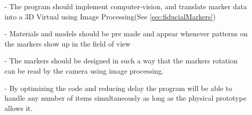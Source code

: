 \begin{itemize}
						\item[-] The program should implement computer-vision, and translate marker data into a 3D Virtual using Image Processing(See \autoref{sec:fiducialMarkers})
						\item[-] Materials and models should be pre made and appear whenever patterns on the markers show up in the field of view
						\item[-] The markers should be designed in such a way that the markers rotation can be read by the camera using image processing.
						\item[-] By optimizing the code and reducing delay the program will be able to handle any number of items simultaneously as long as the physical prototype allows it.
					\end{itemize}
			